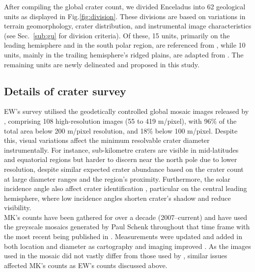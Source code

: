 \documentclass[preprint,11pt,3p,times,authoryear]{elsarticle}
\begin{document}
After compiling the global crater count, we divided Enceladus into 62 geological units as displayed in  Fig.\ref{fig:division}. These divisions are based on variations in terrain geomorphology, crater distribution, and instrumental image characteristics (see Sec.~\ref{sub:gu} for division criteria).
Of these, 15 units, primarily on the leading hemisphere and in the south polar region, are referenced from \citet{CrowWillard2015}, while 10 units, mainly in the trailing hemisphere’s ridged plains, are adapted from \citet{Kirchoff2009}. The remaining units are newly delineated and proposed in this study. \\ %

\subsection{Details of crater survey}
\label{sub:survey}
EW’s survey utilised the geodetically controlled global mosaic images released by \citet{Bland2018}, comprising 108 high-resolution images (55 to 419 m/pixel), with 96\% of the total area below 200 m/pixel resolution, and 18\% below 100 m/pixel. Despite this, visual variations affect the minimum resolvable crater diameter instrumentally. For instance, sub-kilometre craters are visible in mid-latitudes and equatorial regions but harder to discern near the north pole due to lower resolution, despite similar expected crater abundance based on the crater count at large diameter ranges and the region’s proximity. Furthermore, the solar incidence angle also affect crater identification \citep{Ostrach2011}, particular on the central leading hemisphere, where low incidence angles shorten crater's shadow and reduce visibility.\\

MK's counts have been gathered for over a decade (2007–current) and have used the greyscale mosaics generated by Paul Schenk throughout that time frame \citep{Schenk2011,Schenk2018} with the most recent being published in \citet{Schenk2024}. Measurements were updated and added in both location and diameter as cartography and imaging improved \citet{Kirchoff2016,Kirchoff2018}. As the images used in the mosaic did not vastly differ from those used by \citet{Bland2018}, similar issues affected MK's counts as EW's counts discussed above.\\
\end{document}
